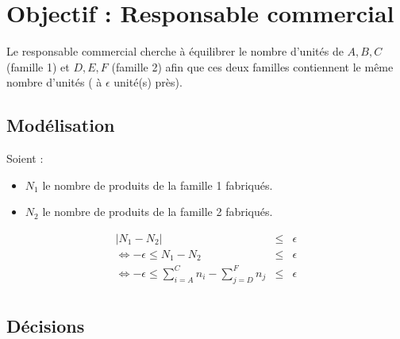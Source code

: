 \newpage
\section{Objectif : Responsable commercial}
Le responsable commercial cherche à équilibrer le nombre
d'unités de ${A, B, C}$ (famille 1) et ${D, E, F}$ (famille 2) afin que ces deux
familles contiennent le même nombre d'unités ( à $\epsilon$
unité(s) près).

\subsection{Modélisation}
Soient :
\begin{itemize}
  \item $N_1$ le nombre de produits de la famille 1 fabriqués.
  \item $N_2$ le nombre de produits de la famille 2 fabriqués.
\end{itemize}

\begin{eqnarray*}
	|N_1 - N_2| &\leq& \epsilon\\
	\Leftrightarrow -\epsilon \leq N_1 - N_2 &\leq& \epsilon\\
	\Leftrightarrow -\epsilon \leq \sum_{i = A}^{C} n_i - \sum_{j = D}^{F} n_j
	&\leq& \epsilon\\
\end{eqnarray*} 

\subsection{Décisions}
